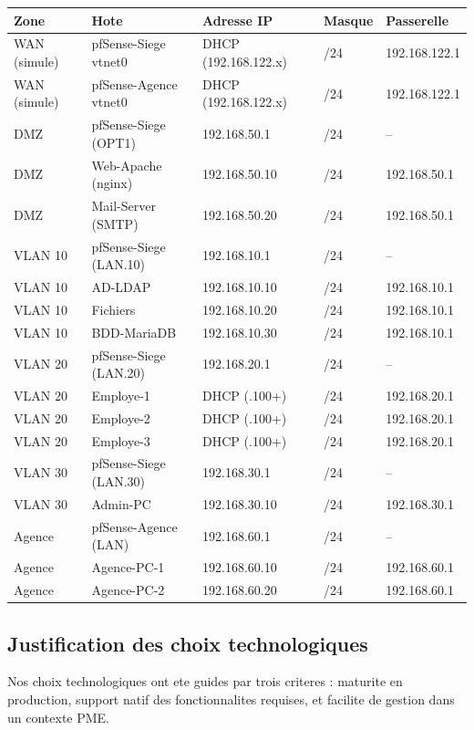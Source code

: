 \documentclass[11pt,a4paper]{article}
\begin{document}
\begin{longtable}{@{}lllll@{}}
\toprule
\textbf{Zone} & \textbf{Hote} & \textbf{Adresse IP} & \textbf{Masque} & \textbf{Passerelle} \\
\midrule
\endhead
WAN (simule) & pfSense-Siege vtnet0 & DHCP (192.168.122.x) & /24 & 192.168.122.1 \\
WAN (simule) & pfSense-Agence vtnet0 & DHCP (192.168.122.x) & /24 & 192.168.122.1 \\
\midrule
DMZ & pfSense-Siege (OPT1) & 192.168.50.1 & /24 & -- \\
DMZ & Web-Apache (nginx) & 192.168.50.10 & /24 & 192.168.50.1 \\
DMZ & Mail-Server (SMTP) & 192.168.50.20 & /24 & 192.168.50.1 \\
\midrule
VLAN 10 & pfSense-Siege (LAN.10) & 192.168.10.1 & /24 & -- \\
VLAN 10 & AD-LDAP & 192.168.10.10 & /24 & 192.168.10.1 \\
VLAN 10 & Fichiers & 192.168.10.20 & /24 & 192.168.10.1 \\
VLAN 10 & BDD-MariaDB & 192.168.10.30 & /24 & 192.168.10.1 \\
\midrule
VLAN 20 & pfSense-Siege (LAN.20) & 192.168.20.1 & /24 & -- \\
VLAN 20 & Employe-1 & DHCP (.100+) & /24 & 192.168.20.1 \\
VLAN 20 & Employe-2 & DHCP (.100+) & /24 & 192.168.20.1 \\
VLAN 20 & Employe-3 & DHCP (.100+) & /24 & 192.168.20.1 \\
\midrule
VLAN 30 & pfSense-Siege (LAN.30) & 192.168.30.1 & /24 & -- \\
VLAN 30 & Admin-PC & 192.168.30.10 & /24 & 192.168.30.1 \\
\midrule
Agence & pfSense-Agence (LAN) & 192.168.60.1 & /24 & -- \\
Agence & Agence-PC-1 & 192.168.60.10 & /24 & 192.168.60.1 \\
Agence & Agence-PC-2 & 192.168.60.20 & /24 & 192.168.60.1 \\
\bottomrule
\end{longtable}

\subsection{Justification des choix technologiques}

Nos choix technologiques ont ete guides par trois criteres : maturite en production, support natif des fonctionnalites requises, et facilite de gestion dans un contexte PME.
\end{document}
